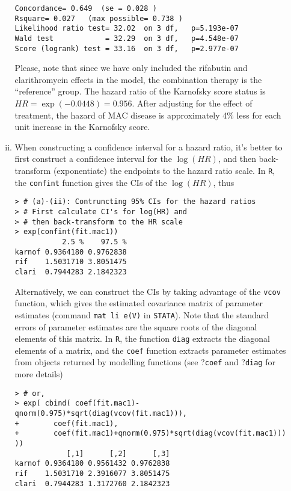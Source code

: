 \begin{enumerate}[(a)]
\begin{enumerate}[(i)]
\begin{footnotesize}
\begin{verbatim}
Concordance= 0.649  (se = 0.028 )
Rsquare= 0.027   (max possible= 0.738 )
Likelihood ratio test= 32.02  on 3 df,   p=5.193e-07
Wald test            = 32.29  on 3 df,   p=4.548e-07
Score (logrank) test = 33.16  on 3 df,   p=2.977e-07
\end{verbatim}
\end{footnotesize}
Please, note that since we have only included the rifabutin
and clarithromycin effects in the model, the combination therapy is the
“reference” group. The hazard ratio of the Karnofsky score status is 
$HR = \exp(-0.0448)=0.956$. 
After adjusting for the effect of treatment, the hazard of MAC disease is 
approximately 4\% less for each unit increase in the Karnofsky score.
\item When constructing a confidence interval for a hazard ratio, it's better to first construct a confidence interval for the $\log(HR)$, and then back-transform (exponentiate) the endpoints to the hazard ratio scale. In \verb|R|, the \verb|confint| function gives the CIs of the $\log(HR)$, thus
\begin{footnotesize}
\begin{verbatim}
> # (a)-(ii): Contruncting 95% CIs for the hazard ratios
> # First calculate CI's for log(HR) and 
> # then back-transform to the HR scale
> exp(confint(fit.mac1))
           2.5 %    97.5 %
karnof 0.9364180 0.9762838
rif    1.5031710 3.8051475
clari  0.7944283 2.1842323
\end{verbatim}
\end{footnotesize}
Alternatively, we can construct the CIs by taking advantage of the \verb|vcov| function, which gives the estimated covariance matrix of parameter estimates (command \verb|mat li e(V)| in \verb|STATA|). Note that the standard errors of parameter estimates are the square roots of the diagonal elements of this matrix.
In \verb|R|, the function \verb|diag| extracts the diagonal elements of a matrix, and the \verb|coef| function extracts parameter estimates from objects  returned by modelling functions (see ?\verb|coef| and ?\verb|diag| for more details)   
\begin{footnotesize}
\begin{verbatim}
> # or,
> exp( cbind( coef(fit.mac1)-qnorm(0.975)*sqrt(diag(vcov(fit.mac1))),
+        coef(fit.mac1),
+        coef(fit.mac1)+qnorm(0.975)*sqrt(diag(vcov(fit.mac1))) ))
            [,1]      [,2]      [,3]
karnof 0.9364180 0.9561432 0.9762838
rif    1.5031710 2.3916077 3.8051475
clari  0.7944283 1.3172760 2.1842323
\end{verbatim}

\end{footnotesize}
\end{enumerate}
\end{enumerate}
